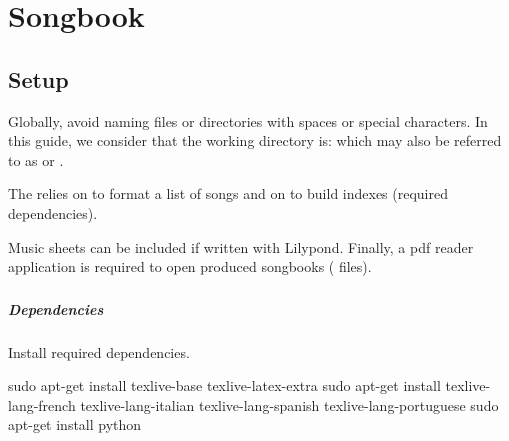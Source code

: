 \chapter{Songbook}
\setcounter{chapter}{1}
\label{chap:songbook}
\minitoc
{}


\section{Setup}
\label{sec:install}

Globally, avoid naming files or directories with spaces or special
characters. In this guide, we consider that the working directory is:
 which may also be referred to as
 or .

The \songbook relies on \latex to format a list of songs and on
\python to build indexes (required dependencies). 

Music sheets can be included if written with Lilypond.  Finally, a pdf
reader application is required to open produced songbooks (
files).

\subsection{\linux}

\paragraph{Dependencies}

Install required dependencies.
\begin{unix}
  sudo apt-get install texlive-base texlive-latex-extra
  sudo apt-get install texlive-lang-french texlive-lang-italian texlive-lang-spanish texlive-lang-portuguese
  sudo apt-get install python
\end{unix}

